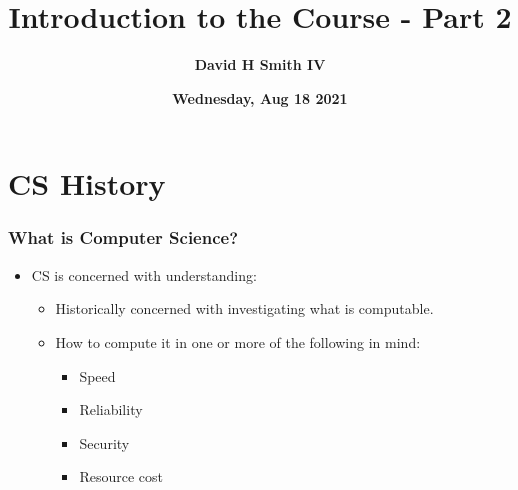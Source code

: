 \documentclass{beamer}
\title{\textbf{Introduction to the Course - Part 2}}
\author{\textbf{David H Smith IV}}
\institute[\textbf{UIUC}]{\textbf{University of Illinois Urbana-Champaign}}
\date{\textbf{Wednesday, Aug 18 2021}}
\begin{document}
\frame{\titlepage}


\section{CS History}

%
%
\begin{frame}
  \frametitle{What is Computer Science?}
  \begin{itemize}
    \item CS is concerned with understanding:
      \begin{itemize}
      \item Historically concerned with investigating what is computable.
      \item How to compute it in one or more of the following in mind:
        \begin{itemize}
        \item Speed
        \item Reliability
        \item Security 
        \item Resource cost
      \end{itemize}
  \end{itemize}
  \end{itemize}
\end{frame}
\end{document}
